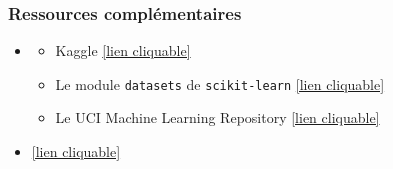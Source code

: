 \begin{frame}
  \frametitle{Ressources complémentaires}
  \begin{itemize}
  \item {}
    \begin{itemize}
    \item Kaggle \textcolor{MyBlue}{\href{https://www.kaggle.com/}{[lien cliquable]}}
    \item Le module \texttt{datasets} de \texttt{scikit-learn} \textcolor{MyBlue}{\href{https://scikit-learn.org/stable/datasets.html}{[lien cliquable]}}
    \item Le UCI Machine Learning Repository \textcolor{MyBlue}{\href{https://archive.ics.uci.edu/ml/index.php}{[lien cliquable]}}
    \end{itemize}
  \item {} \textcolor{MyBlue}{\href{https://inria.github.io/scikit-learn-mooc/}{[lien cliquable]}}
  \end{itemize}
\end{frame}
